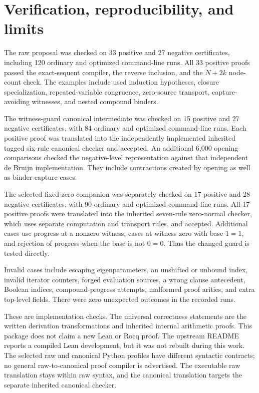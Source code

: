 \documentclass[11pt]{article}
\theoremstyle{definition}
\begin{document}
\section{Verification, reproducibility, and limits}
\label{sec:verification}

The raw proposal was checked on 33 positive and 27 negative certificates,
including 120 ordinary and optimized command-line runs. All 33 positive
proofs passed the exact-sequent compiler, the reverse inclusion, and the
$N+2k$ node-count check. The examples include used induction hypotheses,
closure specialization, repeated-variable congruence, zero-source
transport, capture-avoiding witnesses, and nested compound binders.

The witness-guard canonical intermediate was checked on 15 positive and 27 negative
certificates, with 84 ordinary and optimized command-line runs. Each
positive proof was translated into the independently implemented inherited
tagged six-rule canonical checker and accepted. An additional 6,000
opening comparisons checked the negative-level representation against
that independent de Bruijn implementation. They include contractions
created by opening as well as binder-capture cases.

The selected fixed-zero companion was separately checked on 17 positive
and 28 negative certificates, with 90 ordinary and optimized command-line
runs. All 17 positive proofs were translated into the inherited seven-rule
zero-normal checker, which uses separate computation and transport rules,
and accepted. Additional cases use progress at a nonzero witness, cases
at witness zero with base $1=1$, and rejection of progress when the base
is not $0=0$. Thus the changed guard is tested directly.

Invalid cases include escaping eigenparameters, an unshifted or unbound
index, invalid iterator counters, forged evaluation sources, a wrong
clause antecedent, Boolean indices, compound-progress attempts, malformed
proof arities, and extra top-level fields. There were zero unexpected
outcomes in the recorded runs.

These are implementation checks. The universal correctness statements
are the written derivation transformations and inherited internal
arithmetic proofs. This package does not claim a new Lean or Rocq proof.
The upstream README reports a compiled Lean development, but it was not
rebuilt during this work. The selected raw and canonical Python profiles
have different syntactic contracts; no general raw-to-canonical proof
compiler is advertised. The executable raw translation stays within raw
syntax, and the canonical translation targets the separate inherited
canonical checker.
\end{document}
